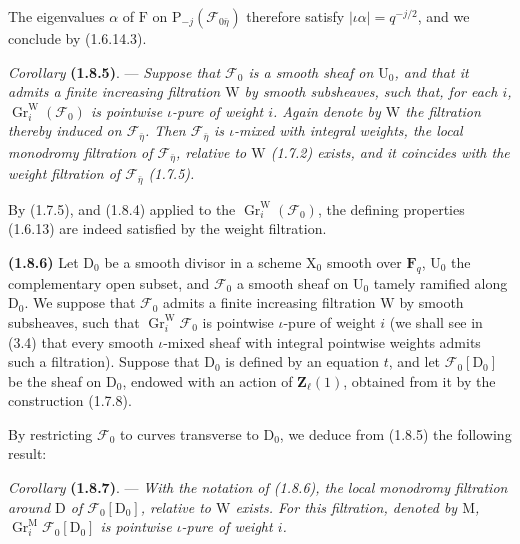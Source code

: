 \documentclass[11pt,leqno]{article}
\begin{document}
The eigenvalues \(\alpha\) of \(\mathrm{F}\) on \(\mathrm{P}_{-j}(\mathscr{F}_{0\bar{\eta}})\) therefore satisfy \(|\iota\alpha|=q^{-j/2}\), and we conclude by (1.6.14.3).

\textit{Corollary} \textbf{(1.8.5)}. — \textit{Suppose that \(\mathscr{F}_0\) is a smooth sheaf on \(\mathrm{U}_0\), and that it admits a finite increasing filtration \(\mathrm{W}\) by smooth subsheaves, such that, for each \(i\), \(\operatorname{Gr}_i^{\mathrm{W}}(\mathscr{F}_0)\) is pointwise \(\iota\)-pure of weight \(i\). Again denote by \(\mathrm{W}\) the filtration thereby induced on \(\mathscr{F}_{\bar{\eta}}\). Then \(\mathscr{F}_{\bar{\eta}}\) is \(\iota\)-mixed with integral weights, the local monodromy filtration of \(\mathscr{F}_{\bar{\eta}}\), relative to \(\mathrm{W}\) \textup{(1.7.2)} exists, and it coincides with the weight filtration of \(\mathscr{F}_{\bar{\eta}}\) \textup{(1.7.5)}.}

By (1.7.5), and (1.8.4) applied to the \(\operatorname{Gr}_i^{\mathrm{W}}(\mathscr{F}_0)\), the defining properties (1.6.13) are indeed satisfied by the weight filtration.

\textbf{(1.8.6)} Let \(\mathrm{D}_0\) be a smooth divisor in a scheme \(\mathrm{X}_0\) smooth over \(\mathbf{F}_q\), \(\mathrm{U}_0\) the complementary open subset, and \(\mathscr{F}_0\) a smooth sheaf on \(\mathrm{U}_0\) tamely ramified along \(\mathrm{D}_0\). We suppose that \(\mathscr{F}_0\) admits a finite increasing filtration \(\mathrm{W}\) by smooth subsheaves, such that \(\operatorname{Gr}_i^{\mathrm{W}}\mathscr{F}_0\) is pointwise \(\iota\)-pure of weight \(i\) (we shall see in (3.4) that every smooth \(\iota\)-mixed sheaf with integral pointwise weights admits such a filtration). Suppose that \(\mathrm{D}_0\) is defined by an equation \(t\), and let \(\mathscr{F}_0[\mathrm{D}_0]\) be the sheaf on \(\mathrm{D}_0\), endowed with an action of \(\mathbf{Z}_\ell(1)\), obtained from it by the construction (1.7.8).

By restricting \(\mathscr{F}_0\) to curves transverse to \(\mathrm{D}_0\), we deduce from (1.8.5) the following result:

\textit{Corollary} \textbf{(1.8.7)}. — \textit{With the notation of \textup{(1.8.6)}, the local monodromy filtration around \(\mathrm{D}\) of \(\mathscr{F}_0[\mathrm{D}_0]\), relative to \(\mathrm{W}\) exists. For this filtration, denoted by \(\mathrm{M}\), \(\operatorname{Gr}_i^{\mathrm{M}}\mathscr{F}_0[\mathrm{D}_0]\) is pointwise \(\iota\)-pure of weight \(i\).}
\end{document}
